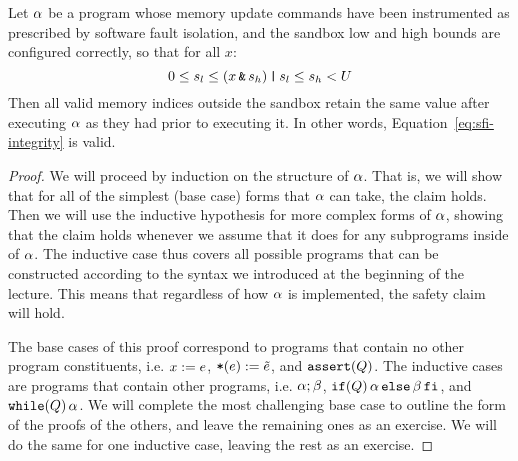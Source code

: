\documentclass[11pt,twoside]{scrartcl}
\begin{document}
\begin{theorem}
\label{thm:sfi-correctness}
Let $\alpha$ be a program whose memory update commands have been instrumented as prescribed by software fault isolation, and the sandbox low and high bounds are configured correctly, so that for all $x$:
\begin{equation}
\label{eq:bounds-assump}
0 \le s_l \le  (x \bitand s_h) \bitor s_l \le s_h < \maxmem
\end{equation}
Then all valid memory indices outside the sandbox retain the same value after executing $\alpha$ as they had prior to executing it. In other words, Equation~\ref{eq:sfi-integrity} is valid.
\end{theorem}
\begin{proof}
We will proceed by induction on the structure of $\alpha$. That is, we will show that for all of the simplest (base case) forms that $\alpha$ can take, the claim holds. Then we will use the inductive hypothesis for more complex forms of $\alpha$, showing that the claim holds whenever we assume that it does for any subprograms inside of $\alpha$. The inductive case thus covers all possible programs that can be constructed according to the syntax we introduced at the beginning of the lecture. This means that regardless of how $\alpha$ is implemented, the safety claim will hold.

The base cases of this proof correspond to programs that contain no other program constituents, i.e. $x:=e$, $\texttt{\upshape *}(e):=\tilde{e}$, and $\texttt{\upshape assert}(Q)$. The inductive cases are programs that contain other programs, i.e. $\alpha;\beta$, $\texttt{\upshape if}(Q)\,\alpha\,\texttt{\upshape else}\,\beta\texttt{\upshape \,fi}$, and $\texttt{\upshape while}(Q)\,\alpha$. We will complete the most challenging base case to outline the form of the proofs of the others, and leave the remaining ones as an exercise. We will do the same for one inductive case, leaving the rest as an exercise.


\end{proof}
\end{document}
